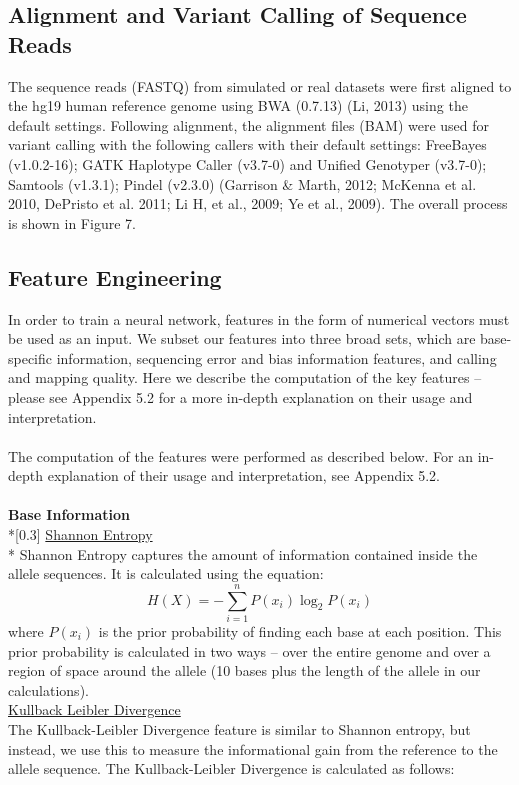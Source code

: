 \documentclass{article}
\begin{document}
\subsection{Alignment and Variant Calling of Sequence Reads} 
The sequence reads (FASTQ) from simulated or real datasets were first aligned to the hg19 human reference genome using BWA (0.7.13) (Li, 2013) using the default settings. Following alignment, the alignment files (BAM) were used for variant calling with the following callers with their default settings: FreeBayes (v1.0.2-16); GATK Haplotype Caller (v3.7-0) and Unified Genotyper (v3.7-0); Samtools (v1.3.1); Pindel (v2.3.0) (Garrison \& Marth, 2012; McKenna et al. 2010, DePristo et al. 2011; Li H, et al., 2009; Ye et al., 2009). The overall process is shown in Figure 7.
\subsection{Feature Engineering}
In order to train a neural network, features in the form of numerical vectors must be used as an input. We subset our features into three broad sets, which are base-specific information, sequencing error and bias information features, and calling and mapping quality. Here we describe the computation of the key features -- please see Appendix 5.2 for a more in-depth explanation on their usage and interpretation.\\\\
The computation of the features were performed as described below. For an in-depth explanation of their usage and interpretation, see Appendix 5.2.\\\\
\textbf{Base Information} \\*[0.3\baselineskip]
\underline{Shannon Entropy}\\*
Shannon Entropy captures the amount of information contained inside the allele sequences. It is calculated using the equation:
\begin{equation}
H(X) = -\sum_{i=1}^{n}P(x_i)\log_{2}P(x_i)
\end{equation}
where $P(x_i)$ is the prior probability of finding each base at each position. This prior probability is calculated in two ways -- over the entire genome and over a region of space around the allele (10 bases plus the length of the allele in our calculations).\\[0.3\baselineskip]
\underline{Kullback Leibler Divergence}\\
The Kullback-Leibler Divergence feature is similar to Shannon entropy, but instead, we use this to measure the informational gain from the reference to the allele sequence. The Kullback-Leibler Divergence is calculated as follows:
\end{document}
